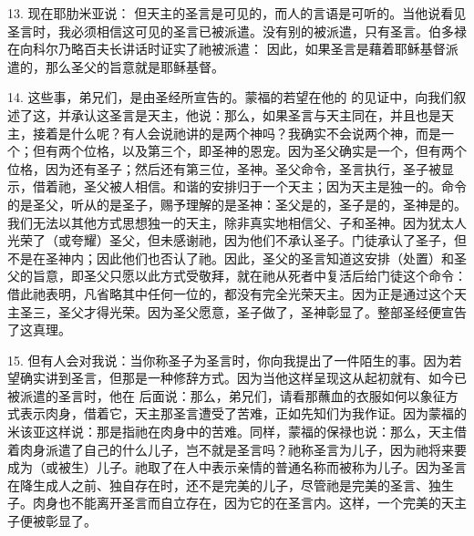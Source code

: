 13. 现在耶肋米亚说： 但天主的圣言是可见的，而人的言语是可听的。当他说看见圣言时，我必须相信这可见的圣言已被派遣。没有别的被派遣，只有圣言。伯多禄在向科尔乃略百夫长讲话时证实了祂被派遣： 因此，如果圣言是藉着耶稣基督派遣的，那么圣父的旨意就是耶稣基督。\par

14. 这些事，弟兄们，是由圣经所宣告的。蒙福的若望在他的  的见证中，向我们叙述了这，并承认这圣言是天主，他说：那么，如果圣言与天主同在，并且也是天主，接着是什么呢？有人会说祂讲的是两个神吗？我确实不会说两个神，而是一个；但有两个位格，以及第三个，即圣神的恩宠。因为圣父确实是一个，但有两个位格，因为还有圣子；然后还有第三位，圣神。圣父命令，圣言执行，圣子被显示，借着祂，圣父被人相信。和谐的安排归于一个天主；因为天主是独一的。命令的是圣父，听从的是圣子，赐予理解的是圣神：圣父是的，圣子是的，圣神是的。我们无法以其他方式思想独一的天主，除非真实地相信父、子和圣神。因为犹太人光荣了（或夸耀）圣父，但未感谢祂，因为他们不承认圣子。门徒承认了圣子，但不是在圣神内；因此他们也否认了祂。因此，圣父的圣言知道这安排（处置）和圣父的旨意，即圣父只愿以此方式受敬拜，就在祂从死者中复活后给门徒这个命令：借此祂表明，凡省略其中任何一位的，都没有完全光荣天主。因为正是通过这个天主圣三，圣父才得光荣。因为圣父愿意，圣子做了，圣神彰显了。整部圣经便宣告了这真理。\par

15. 但有人会对我说：当你称圣子为圣言时，你向我提出了一件陌生的事。因为若望确实讲到圣言，但那是一种修辞方式。因为当他这样呈现这从起初就有、如今已被派遣的圣言时，他在  后面说：那么，弟兄们，请看那蘸血的衣服如何以象征方式表示肉身，借着它，天主那圣言遭受了苦难，正如先知们为我作证。因为蒙福的米该亚这样说：那是指祂在肉身中的苦难。同样，蒙福的保禄也说：那么，天主借着肉身派遣了自己的什么儿子，岂不就是圣言吗？祂称圣言为儿子，因为祂将来要成为（或被生）儿子。祂取了在人中表示亲情的普通名称而被称为儿子。因为圣言在降生成人之前、独自存在时，还不是完美的儿子，尽管祂是完美的圣言、独生子。肉身也不能离开圣言而自立存在，因为它的在圣言内。这样，一个完美的天主子便被彰显了。\par

